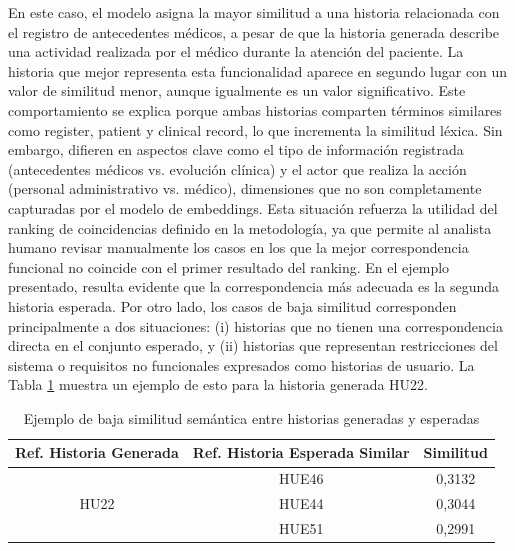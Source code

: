 En este caso, el modelo asigna la mayor similitud a una historia relacionada con el registro de antecedentes médicos, a pesar de que la historia generada describe una actividad realizada por el médico durante la atención del paciente. La historia que mejor representa esta funcionalidad aparece en segundo lugar con un valor de similitud menor, aunque igualmente es un valor significativo.
Este comportamiento se explica porque ambas historias comparten términos similares como register, patient y clinical record, lo que incrementa la similitud léxica. Sin embargo, difieren en aspectos clave como el tipo de información registrada (antecedentes médicos vs. evolución clínica) y el actor que realiza la acción (personal administrativo vs. médico), dimensiones que no son completamente capturadas por el modelo de embeddings.
Esta situación refuerza la utilidad del ranking de coincidencias definido en la metodología, ya que permite al analista humano revisar manualmente los casos en los que la mejor correspondencia funcional no coincide con el primer resultado del ranking. En el ejemplo presentado, resulta evidente que la correspondencia más adecuada es la segunda historia esperada.
Por otro lado, los casos de baja similitud corresponden principalmente a dos situaciones: (i) historias que no tienen una correspondencia directa en el conjunto esperado, y (ii) historias que representan restricciones del sistema o requisitos no funcionales expresados como historias de usuario.
La Tabla \ref{tab:low_similarity_example} muestra un ejemplo de esto para la historia generada HU22.

\begin{table}[h!]
\centering
\small
\begin{tabular}{|c|c|c|}
\hline
\textbf{Ref. Historia Generada} & \textbf{Ref. Historia Esperada Similar} & \textbf{Similitud} \\
\hline

\multirow{3}{*}{HU22} & HUE46 & 0,3132 \\
\cline{2-3}
                      & HUE44 & 0,3044 \\
\cline{2-3}
                      & HUE51 & 0,2991 \\
\hline

\end{tabular}
\caption{Ejemplo de baja similitud semántica entre historias generadas y esperadas}
\label{tab:low_similarity_example}
\end{table}

